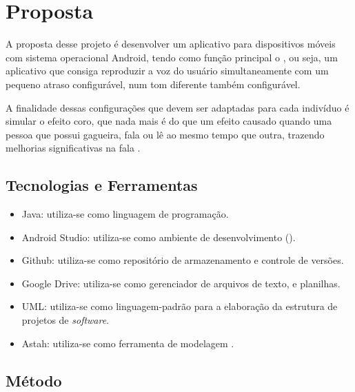 \chapter{Proposta}

A proposta desse projeto \'e desenvolver um aplicativo para dispositivos m\'oveis com sistema operacional Android, tendo como fun\c{c}\~ao principal o , ou seja, um aplicativo que consiga reproduzir a voz do usu\'ario simultaneamente com um pequeno atraso configur\'avel, num tom diferente tamb\'em configur\'avel. 

A finalidade dessas configura\c{c}\~oes que devem ser adaptadas para cada indiv\'iduo \'e simular o efeito coro, que nada mais \'e do que um efeito causado quando uma pessoa que possui gagueira, fala ou l\^e ao mesmo tempo que outra, trazendo melhorias significativas na fala \cite{Udemo2008}.

\section{Tecnologias e Ferramentas}
\begin{itemize}
	
	\item Java: utiliza-se como linguagem de programa\c{c}\~ao.
	
	\item Android Studio: utiliza-se como ambiente de desenvolvimento 		().

	\item Github: utiliza-se como reposit\'orio de armazenamento e controle de vers\~oes.
	
	\item Google Drive: utiliza-se como gerenciador de arquivos de texto, e planilhas.

	\item UML: utiliza-se como linguagem-padr\~ao para a elabora\c{c}\~ao da estrutura de projetos de \textit{software}.

	\item Astah: utiliza-se como ferramenta de modelagem . 

\end{itemize}

\section{M\'etodo}

